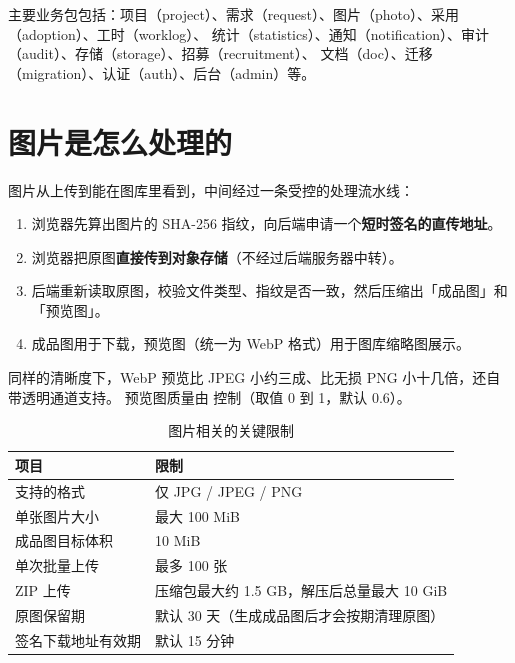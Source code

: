 \documentclass[cn,11pt,green]{elegantbook}
\begin{document}
主要业务包包括：项目（project）、需求（request）、图片（photo）、采用（adoption）、工时（worklog）、
统计（statistics）、通知（notification）、审计（audit）、存储（storage）、招募（recruitment）、
文档（doc）、迁移（migration）、认证（auth）、后台（admin）等。

\section{图片是怎么处理的}

图片从上传到能在图库里看到，中间经过一条受控的处理流水线：

\begin{enumerate}
  \item 浏览器先算出图片的 SHA-256 指纹，向后端申请一个\textbf{短时签名的直传地址}。
  \item 浏览器把原图\textbf{直接传到对象存储}（不经过后端服务器中转）。
  \item 后端重新读取原图，校验文件类型、指纹是否一致，然后压缩出「成品图」和「预览图」。
  \item 成品图用于下载，预览图（统一为 WebP 格式）用于图库缩略图展示。
\end{enumerate}

\begin{notebox}
  同样的清晰度下，WebP 预览比 JPEG 小约三成、比无损 PNG 小十几倍，还自带透明通道支持。
  预览图质量由  控制（取值 0 到 1，默认 0.6）。
\end{notebox}

\begin{table}[htbp]
  \centering
  \caption{图片相关的关键限制}
  \begin{tabular}{L{5.5cm} L{6.6cm}}
    \toprule
    \textbf{项目} & \textbf{限制} \\
    \midrule
    支持的格式 & 仅 JPG / JPEG / PNG \\
    单张图片大小 & 最大 100 MiB \\
    成品图目标体积 & 10 MiB \\
    单次批量上传 & 最多 100 张 \\
    ZIP 上传 & 压缩包最大约 1.5 GB，解压后总量最大 10 GiB \\
    原图保留期 & 默认 30 天（生成成品图后才会按期清理原图） \\
    签名下载地址有效期 & 默认 15 分钟 \\
    \bottomrule
  \end{tabular}
\end{table}
\end{document}
